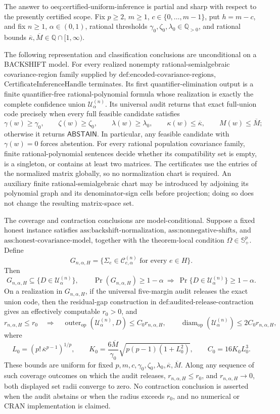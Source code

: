 The answer to \(\text{oeq:certified-uniform-inference}\) is partial and sharp with respect to the presently certified scope. Fix \(p\geq2\), \(m\geq1\), \(c\in\{0,\ldots,m-1\}\), put \(h=m-c\), and fix \(n\geq1\), \(\alpha\in(0,1)\), rational thresholds \(\gamma_0,\zeta_0,\lambda_0\in\mathbb Q_{>0}\), and rational bounds \(\overline\kappa,\overline M\in\mathbb Q\cap[1,\infty)\).

The following representation and classification conclusions are unconditional on a BACKSHIFT model. For every realized nonempty rational-semialgebraic covariance-region family supplied by \(\text{def:encoded-covariance-regions}\), \(\text{CertificateInferenceHandle}\) terminates. Its first quantifier-elimination output is a finite quantifier-free rational-polynomial formula whose realization is exactly the complete confidence union \(\mathcal U^{(n)}_\alpha\). Its universal audit returns that exact full-union code precisely when every full feasible candidate satisfies
\[
\gamma(w)\geq\gamma_0,\qquad
\zeta(w)\geq\zeta_0,\qquad
\lambda(w)\geq\lambda_0,\qquad
\kappa(w)\leq\overline\kappa,\qquad
M(w)\leq\overline M;
\]
otherwise it returns \(\mathsf{ABSTAIN}\). In particular, any feasible candidate with \(\gamma(w)=0\) forces abstention. For every rational population covariance family, finite rational-polynomial sentences decide whether its compatibility set is empty, is a singleton, or contains at least two matrices. The certificates use the entries of the normalized matrix globally, so no normalization chart is required. An auxiliary finite rational-semialgebraic chart may be introduced by adjoining its polynomial graph and its denominator-sign cells before projection; doing so does not change the resulting matrix-space set.

The coverage and contraction conclusions are model-conditional. Suppose a fixed honest instance satisfies \(\text{ass:backshift-normalization}\), \(\text{ass:nonnegative-shifts}\), and \(\text{ass:honest-covariance-model}\), together with the theorem-local condition \(\Omega\in\mathbb S_+^p\). Define
\[
G_{n,\alpha,H}
=\{\Sigma_e\in\mathcal C^{(n)}_{e,\alpha}\text{ for every }e\in H\}.
\]
Then
\[
G_{n,\alpha,H}\subseteq\{D\in\mathcal U^{(n)}_\alpha\},
\qquad
\Pr(G_{n,\alpha,H})\geq1-\alpha
\ \Longrightarrow\ 
\Pr\{D\in\mathcal U^{(n)}_\alpha\}\geq1-\alpha.
\]
On a realization in \(G_{n,\alpha,H}\), if the universal five-margin audit releases the exact union code, then the residual-gap construction in \(\text{def:audited-release-contraction}\) gives an effectively computable \(r_0>0\), and
\[
r_{n,\alpha,H}\leq r_0
\quad\Longrightarrow\quad
\operatorname{outer}_{\mathrm{op}}(\mathcal U^{(n)}_\alpha,D)
\leq C_0r_{n,\alpha,H},
\qquad
\operatorname{diam}_{\mathrm{op}}(\mathcal U^{(n)}_\alpha)
\leq2C_0r_{n,\alpha,H},
\]
where
\[
L_0=(p!\,\overline\kappa^{p-1})^{1/p},\qquad
K_0=\frac{6\overline M}{\gamma_0}\sqrt{p(p-1)(1+L_0^2)},
\qquad C_0=16K_0L_0^3.
\]
These bounds are uniform for fixed \(p,m,c,\gamma_0,\zeta_0,\lambda_0,\overline\kappa,\overline M\). Along any sequence of such coverage outcomes on which the audit releases, \(r_{n,\alpha,H}\leq r_0\), and \(r_{n,\alpha,H}\to0\), both displayed set radii converge to zero. No contraction conclusion is asserted when the audit abstains or when the radius exceeds \(r_0\), and no numerical or CRAN implementation is claimed.